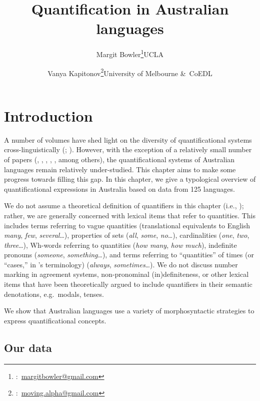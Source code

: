 \documentclass[12pt,egregdoesnotlikesansseriftitles]{scrartcl}
\title{Quantification in Australian languages}
\author{Margit Bowler\thanks{\Letter:~\href{mailto:margitbowler@gmail.com}{margitbowler@gmail.com}}\authorcr UCLA \and \vspace{-.5cm}Vanya Kapitonov\thanks{\Letter:~\href{mailto:moving.alpha@gmail.com}{moving.alpha@gmail.com}}\authorcr University of Melbourne \&\ CoEDL}
\begin{document}
\maketitle

\section{Introduction}

A number of volumes have shed light on the diversity of quantificational systems cross-linguistically (\citealt{keenanpaperno17,keenanpaperno12}; \citealt{bachetal95}). However, with the exception of a relatively small number of papers (\citealt{bowler17}, \citealt{bowernzentz12}, \citealt{bittnerhale95}, \citealt{evans95}, \citealt{laughren81}, among others), the quantificational systems of Australian languages remain relatively under-studied. This chapter aims to make some progress towards filling this gap. In this chapter, we give a typological overview of quantificational expressions in Australia based on data from 125 languages.

We do not assume a theoretical definition of quantifiers in this chapter (i.e., \citealt{heimkratzer98}); rather, we are generally concerned with lexical items that refer to quantities. This includes terms referring to vague quantities (translational equivalents to English \textit{many}, \textit{few}, \textit{several}\ldots), properties of sets (\textit{all}, \textit{some}, \textit{no}\ldots), cardinalities (\textit{one}, \textit{two}, \textit{three}\ldots), Wh-words referring to quantities (\textit{how many}, \textit{how much}), indefinite pronouns (\textit{someone}, \textit{something}\ldots), and terms referring to ``quantities'' of times (or ``cases,'' in \citealt{lewis75}'s terminology) (\textit{always}, \textit{sometimes}\ldots). We do not discuss number marking in agreement systems, non-pronominal (in)definiteness, or other lexical items that have been theoretically argued to include quantifiers in their semantic denotations, e.g.\ modals, tenses.

We show that Australian languages use a variety of morphosyntactic strategies to express quantificational concepts.

\subsection{Our data}

\end{document}
